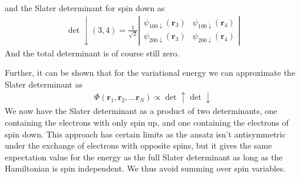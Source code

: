 \documentclass[x11names]{article}
\begin{document}
			and the Slater determinant for spin down as
			\begin{align}
				\det\downarrow(3,4)=\frac{1}{\sqrt{2}}\left|\begin{array}{cc}
				\psi_{100\downarrow}(\mathbf{r}_{3}) & \psi_{100\downarrow}(\mathbf{r}_{4})\\
				\psi_{200\downarrow}(\mathbf{r}_{3}) & \psi_{200\downarrow}(\mathbf{r}_{4})
				\end{array}\right|
			\end{align}
			And the total determinant is of course still zero.

			Further, it can be shown that for the variational energy we can approximate
			the Slater determinant as
			\begin{align}
				\Phi(\mathbf{r}_{1},\mathbf{r}_{2},\dots\mathbf{r}_{N})\propto\det\uparrow\det\downarrow
			\end{align}
			We now have the Slater determinant as a product of two determinants,
			one containing the electrons with only spin up, and one containing
			the electrons of spin down. This approach has certain limits as the
			ansatz isn't antisymmetric under the exchange of electrons with opposite
			spins, but it gives the same expectation value for the energy as the
			full Slater determinant as long as the Hamiltonian is spin independent.
			We thus avoid summing over spin variables.
\end{document}
